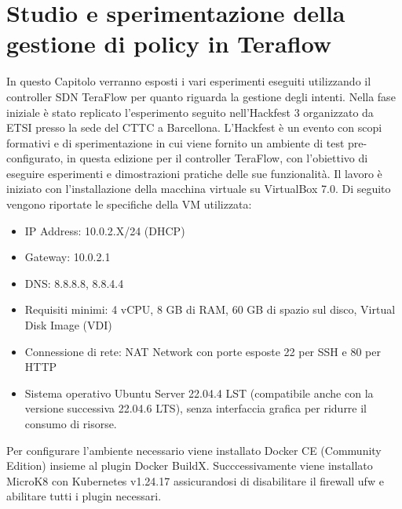 \chapter{Studio e sperimentazione della gestione di policy in Teraflow}
\label{cap:policy}
In questo Capitolo verranno esposti i vari esperimenti eseguiti utilizzando il controller SDN TeraFlow per quanto riguarda la gestione degli intenti.
Nella fase iniziale è stato replicato l'esperimento seguito nell'Hackfest 3 \cite{hackfest} organizzato da ETSI presso la sede del CTTC a Barcellona.
L'Hackfest è un evento con scopi formativi e di sperimentazione in cui viene fornito un ambiente di test pre-configurato, in questa edizione 
per il controller TeraFlow, con l'obiettivo di eseguire esperimenti e dimostrazioni pratiche delle sue funzionalità. 
Il lavoro è iniziato con l'installazione della macchina virtuale \cite{VM} su VirtualBox 7.0.
\newline Di seguito vengono riportate le specifiche della VM utilizzata:
\begin{itemize}
    \item IP Address: 10.0.2.X/24 (DHCP)
    \item Gateway: 10.0.2.1
    \item DNS: 8.8.8.8, 8.8.4.4
    \item Requisiti minimi: 4 vCPU, 8 GB di RAM, 60 GB di spazio sul disco, Virtual Disk Image (VDI)
    \item Connessione di rete: NAT Network con porte esposte 22 per SSH e 80 per HTTP
    \item Sistema operativo Ubuntu Server 22.04.4 LST (compatibile anche con la versione successiva 22.04.6 LTS), senza interfaccia grafica per ridurre il consumo di risorse.
\end{itemize}
Per configurare l'ambiente necessario viene installato Docker CE (Community Edition) insieme al plugin Docker BuildX. Succcessivamente 
viene installato MicroK8 con Kubernetes v1.24.17 assicurandosi di disabilitare il firewall ufw e abilitare tutti i plugin necessari.
